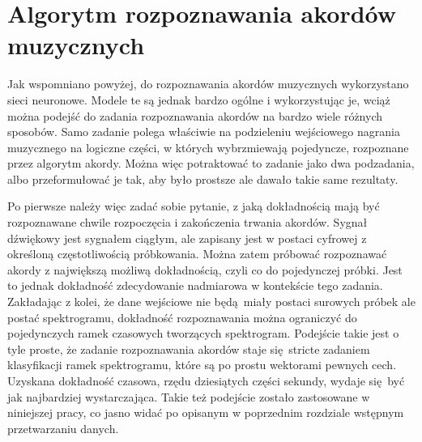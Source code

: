\section{Algorytm rozpoznawania akordów muzycznych}

Jak wspomniano powyżej, do rozpoznawania akordów muzycznych wykorzystano sieci neuronowe. Modele te
są jednak bardzo ogólne i wykorzystując je, wciąż można podejść do zadania rozpoznawania akordów na
bardzo wiele różnych sposobów. Samo zadanie polega właściwie na podzieleniu wejściowego nagrania
muzycznego na logiczne części, w których wybrzmiewają pojedyncze, rozpoznane przez algorytm akordy.
Można więc potraktować to zadanie jako dwa podzadania, albo przeformułować je tak, aby było prostsze
ale dawało takie same rezultaty. 

Po pierwsze należy więc zadać sobie pytanie, z jaką dokładnością mają być rozpoznawane chwile
rozpoczęcia i zakończenia trwania akordów. Sygnał dźwiękowy jest sygnałem ciągłym, ale zapisany jest
w postaci cyfrowej z określoną częstotliwością próbkowania. Można zatem próbować rozpoznawać akordy
z największą możliwą dokładnością, czyli co do pojedynczej próbki. Jest to jednak dokładność
zdecydowanie nadmiarowa w kontekście tego zadania. Zakładając z kolei, że dane wejściowe nie
będą miały postaci surowych próbek ale postać spektrogramu, dokładność rozpoznawania można
ograniczyć do pojedynczych ramek czasowych tworzących spektrogram. Podejście takie jest o tyle
proste, że zadanie rozpoznawania akordów staje się stricte zadaniem klasyfikacji ramek spektrogramu,
które są po prostu wektorami pewnych cech. Uzyskana dokładność czasowa, rzędu dziesiątych części
sekundy, wydaje się być jak najbardziej wystarczająca. Takie też podejście zostało zastosowane w
niniejszej pracy, co jasno widać po opisanym w poprzednim rozdziale wstępnym przetwarzaniu danych.

